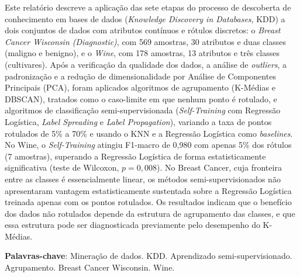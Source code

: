 \begin{resumo}[RESUMO]

Este relatório descreve a aplicação das sete etapas do processo de descoberta de conhecimento em bases de dados (\textit{Knowledge Discovery in Databases}, KDD) a dois conjuntos de dados com atributos contínuos e rótulos discretos: o \textit{Breast Cancer Wisconsin (Diagnostic)}, com 569 amostras, 30 atributos e duas classes (maligno e benigno), e o \textit{Wine}, com 178 amostras, 13 atributos e três classes (cultivares). Após a verificação da qualidade dos dados, a análise de \textit{outliers}, a padronização e a redução de dimensionalidade por Análise de Componentes Principais (PCA), foram aplicados algoritmos de agrupamento (K-Médias e DBSCAN), tratados como o caso-limite em que nenhum ponto é rotulado, e algoritmos de classificação semi-supervisionada (\textit{Self-Training} com Regressão Logística, \textit{Label Spreading} e \textit{Label Propagation}), variando a taxa de pontos rotulados de 5\% a 70\% e usando o KNN e a Regressão Logística como \textit{baselines}. No Wine, o \textit{Self-Training} atingiu F1-macro de 0,980 com apenas 5\% dos rótulos (7 amostras), superando a Regressão Logística de forma estatisticamente significativa (teste de Wilcoxon, $p = 0{,}008$). No Breast Cancer, cuja fronteira entre as classes é essencialmente linear, os métodos semi-supervisionados não apresentaram vantagem estatisticamente sustentada sobre a Regressão Logística treinada apenas com os pontos rotulados. Os resultados indicam que o benefício dos dados não rotulados depende da estrutura de agrupamento das classes, e que essa estrutura pode ser diagnosticada previamente pelo desempenho do K-Médias.

\vspace{\onelineskip}

\noindent
\textbf{Palavras-chave}: Mineração de dados. KDD. Aprendizado semi-supervisionado. Agrupamento. Breast Cancer Wisconsin. Wine.

\end{resumo}
